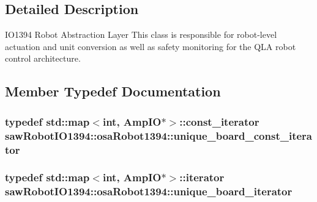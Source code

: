 \subsection{Detailed Description}
I\+O1394 Robot Abstraction Layer This class is responsible for robot-\/level actuation and unit conversion as well as safety monitoring for the Q\+L\+A robot control architecture. 

\subsection{Member Typedef Documentation}
\hypertarget{classsaw_robot_i_o1394_1_1osa_robot1394_a01f7b23037caa05ef8fceb96d032d451}{}
\subsubsection[{unique\+\_\+board\+\_\+const\+\_\+iterator}]{\setlength{\rightskip}{0pt plus 5cm}typedef std\+::map$<$int, Amp\+I\+O$\ast$$>$\+::const\+\_\+iterator {\bf saw\+Robot\+I\+O1394\+::osa\+Robot1394\+::unique\+\_\+board\+\_\+const\+\_\+iterator}\hspace{0.3cm}{\ttfamily [protected]}}\label{classsaw_robot_i_o1394_1_1osa_robot1394_a01f7b23037caa05ef8fceb96d032d451}
\hypertarget{classsaw_robot_i_o1394_1_1osa_robot1394_a978238551892ef80ceb59dfdaca46d9d}{}
\subsubsection[{unique\+\_\+board\+\_\+iterator}]{\setlength{\rightskip}{0pt plus 5cm}typedef std\+::map$<$int, Amp\+I\+O$\ast$$>$\+::iterator {\bf saw\+Robot\+I\+O1394\+::osa\+Robot1394\+::unique\+\_\+board\+\_\+iterator}\hspace{0.3cm}{\ttfamily [protected]}}\label{classsaw_robot_i_o1394_1_1osa_robot1394_a978238551892ef80ceb59dfdaca46d9d}


